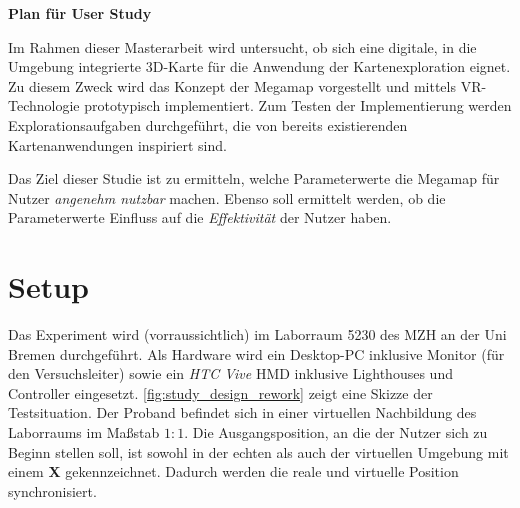 \documentclass[
    draft=false,
    paper=a4,
    fontsize=11pt,
    twoside=false,
    captions=tableheading,
    british, ngerman,
]{scrartcl}
\begin{document}
\begin{center}
    \LARGE\textsf{\textbf{Plan für User Study}}
\end{center}

\noindent
Im Rahmen dieser Masterarbeit wird untersucht, ob sich eine digitale, in die Umgebung integrierte 3D-Karte für die Anwendung der Kartenexploration eignet.
Zu diesem Zweck wird das Konzept der Megamap vorgestellt und mittels VR-Technologie prototypisch implementiert.
Zum Testen der Implementierung werden Explorationsaufgaben durchgeführt, die von bereits existierenden Kartenanwendungen inspiriert sind.

Das Ziel dieser Studie ist zu ermitteln, welche Parameterwerte die Megamap für Nutzer \emph{angenehm nutzbar} machen.
Ebenso soll ermittelt werden, ob die Parameterwerte Einfluss auf die \emph{Effektivität} der Nutzer haben.

\section{Setup}
Das Experiment wird (vorraussichtlich) im Laborraum 5230 des MZH an der Uni Bremen durchgeführt.
Als Hardware wird ein Desktop-PC inklusive Monitor (für den Versuchsleiter) sowie ein \emph{HTC Vive} HMD inklusive Lighthouses und Controller eingesetzt.
\autoref{fig:study_design_rework} zeigt eine Skizze der Testsituation.
Der Proband befindet sich in einer virtuellen Nachbildung des Laborraums im Maßstab $1:1$.
Die Ausgangsposition, an die der Nutzer sich zu Beginn stellen soll, ist sowohl in der echten als auch der virtuellen Umgebung mit einem \textbf{X} gekennzeichnet.
Dadurch werden die reale und virtuelle Position synchronisiert.
\end{document}
